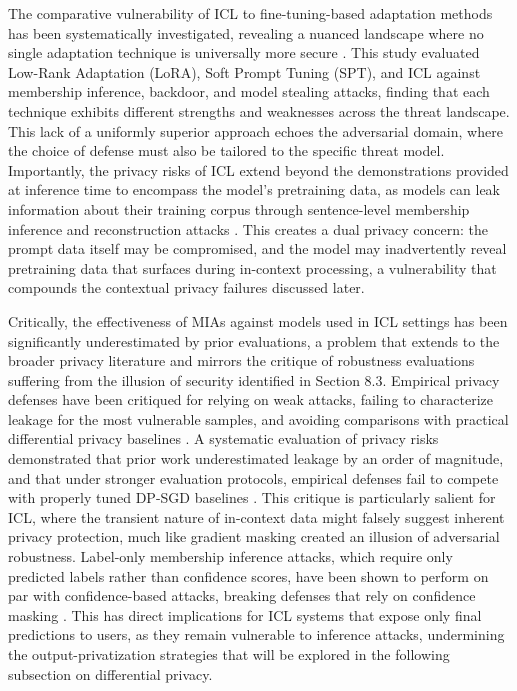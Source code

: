 \documentclass[11pt]{article}
\begin{document}
The comparative vulnerability of ICL to fine-tuning-based adaptation methods has been systematically investigated, revealing a nuanced landscape where no single adaptation technique is universally more secure \cite{ref441}. This study evaluated Low-Rank Adaptation (LoRA), Soft Prompt Tuning (SPT), and ICL against membership inference, backdoor, and model stealing attacks, finding that each technique exhibits different strengths and weaknesses across the threat landscape. This lack of a uniformly superior approach echoes the adversarial domain, where the choice of defense must also be tailored to the specific threat model. Importantly, the privacy risks of ICL extend beyond the demonstrations provided at inference time to encompass the model's pretraining data, as models can leak information about their training corpus through sentence-level membership inference and reconstruction attacks \cite{ref442}. This creates a dual privacy concern: the prompt data itself may be compromised, and the model may inadvertently reveal pretraining data that surfaces during in-context processing, a vulnerability that compounds the contextual privacy failures discussed later.

Critically, the effectiveness of MIAs against models used in ICL settings has been significantly underestimated by prior evaluations, a problem that extends to the broader privacy literature and mirrors the critique of robustness evaluations suffering from the illusion of security identified in Section 8.3. Empirical privacy defenses have been critiqued for relying on weak attacks, failing to characterize leakage for the most vulnerable samples, and avoiding comparisons with practical differential privacy baselines \cite{ref443}. A systematic evaluation of privacy risks demonstrated that prior work underestimated leakage by an order of magnitude, and that under stronger evaluation protocols, empirical defenses fail to compete with properly tuned DP-SGD baselines \cite{ref444}. This critique is particularly salient for ICL, where the transient nature of in-context data might falsely suggest inherent privacy protection, much like gradient masking created an illusion of adversarial robustness. Label-only membership inference attacks, which require only predicted labels rather than confidence scores, have been shown to perform on par with confidence-based attacks, breaking defenses that rely on confidence masking \cite{ref445}. This has direct implications for ICL systems that expose only final predictions to users, as they remain vulnerable to inference attacks, undermining the output-privatization strategies that will be explored in the following subsection on differential privacy.
\end{document}
